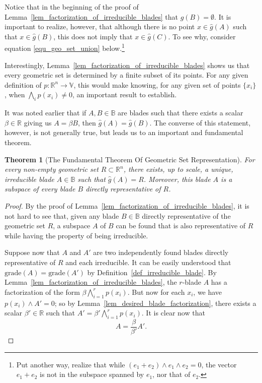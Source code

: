 \documentclass{birkjour}
\newtheorem{thm}{Theorem}[section]
\theoremstyle{definition}
\theoremstyle{remark}
\numberwithin{equation}{section}
\newcommand{\R}{\mathbb{R}}
\newcommand{\B}{\mathbb{B}}
\newcommand{\V}{\mathbb{V}}
\newcommand{\gh}{\hat{g}}
\newcommand{\grade}{\mbox{grade}}
\begin{document}
Notice that in the beginning of the proof of Lemma~\ref{lem_factorization_of_irreducible_blades}
that $\gh(B)=\emptyset$.  It is important to realize, however,
that although there is no point $x\in\gh(A)$ such that $x\in\gh(B)$, this does not imply that $x\in\gh(C)$.
To see why, consider equation \eqref{equ_geo_set_union} below.\footnote{Put another way,
realize that while $(e_1+e_2)\wedge e_1\wedge e_2=0$, the vector $e_1+e_2$ is not in the subspace
spanned by $e_1$, nor that of $e_2$.}

Interestingly, Lemma~\ref{lem_factorization_of_irreducible_blades} shows us that every geometric
set is determined by a finite subset of its points.  For any given definition of $p:\R^n\to\V$, this
would make knowing, for any given set of points $\{x_i\}$, when $\bigwedge_i p(x_i)\neq 0$,
an important result to establish.

It was noted earlier that if $A,B\in\B$ are blades such that there exists a scalar $\beta\in\R$ giving us
$A=\beta B$, then $\gh(A)=\gh(B)$.  The converse of this statement, however,
is not generally true, but leads us to an important and fundamental theorem.

\begin{thm}[The Fundamental Theorem Of Geometric Set Representation]\label{thm_geo_set_rep}
For every non-empty geometric set $R\subset\R^n$, there exists, up to scale, a unique,
irreducible blade $A\in\B$ such that $\gh(A)=R$.  Moreover, this blade $A$ is a
subspace of every blade $B$ directly representative of $R$.
\end{thm}
\begin{proof}
By the proof of Lemma~\ref{lem_factorization_of_irreducible_blades}, it is not hard to see that, given any blade $B\in\B$ directly
representative of the geometric set $R$, a subspace $A$ of $B$ can be found that is
also representative of $R$ while having the property of being irreducible.

Suppose now that $A$ and $A'$ are two independently found blades directly representative of $R$
and each irreducible.  It can be easily understood that $\grade(A)=\grade(A')$ by Definition~\ref{def_irreducible_blade}.
By Lemma~\ref{lem_factorization_of_irreducible_blades}, the $r$-blade $A$ has a factorization
of the form $\beta\bigwedge_{i=1}^r p(x_i)$.  But now for each $x_i$, we have $p(x_i)\wedge A'=0$; so by
Lemma~\ref{lem_desired_blade_factorization}, there exists a scalar $\beta'\in\R$ such that $A'=\beta'\bigwedge_{i=1}^r p(x_i)$.
It is clear now that
\begin{equation}
A = \frac{\beta}{\beta'}A'.
\end{equation}
\end{proof}
\end{document}
